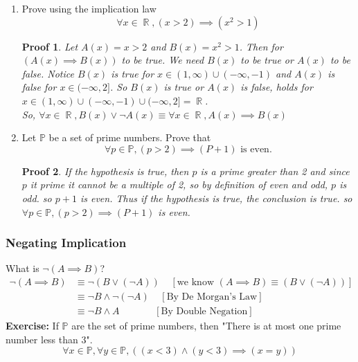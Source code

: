 \documentclass[10pt]{article}
\DeclareMathOperator{\R}{{\mathbb{R}}}
\theoremstyle{break}
\newtheorem*{pf}{Proof}
\begin{document}
\begin{enumerate}
    \item Prove using the implication law
    $$\forall x \in \R, (x > 2) \implies (x^2 > 1)$$
    \begin{pf}
        Let $A(x) = x > 2$ and $B(x) = x^2 > 1$. Then for $(A(x) \implies B(x))$ to be true. We need $B(x)$ to be true or $A(x)$ to be false. Notice 
        $B(x)$ is true for $x \in (1, \infty) \cup (-\infty, -1)$ and $A(x)$ is false for $x \in (-\infty, 2]$. So
        $B(x)$ is true or $A(x)$ is false, holds for $x \in (1, \infty) \cup (-\infty, -1) \cup (-\infty, 2] = \R$.\\
        So, $\forall x \in \R, B(x) \vee \neg A(x) \equiv \forall x \in \R, A(x) \implies B(x)$ 
    \end{pf}
    \item Let $\mathbb{P}$ be a set of prime numbers. Prove that $$\forall p \in \mathbb{P}, (p > 2) \implies (P + 1) \text{ is even.}$$
    \begin{pf}
        If the hypothesis is true, then $p$ is a prime greater than 2 and since $p$ it
        prime it cannot be a multiple of 2, so by definition of even and odd, $p$ is odd. so $p + 1$ is even.
        Thus if the hypothesis is true, the conclusion is true. so $\forall p \in \mathbb{P}, (p > 2) \implies (P + 1)$ is even.
    \end{pf}
\end{enumerate}
\subsubsection{Negating Implication}
What is $\neg (A \implies B)$?
\begin{align*}
    \neg (A \implies B) &\equiv \neg (B \vee (\neg A)) \; \; \; \; [\text{we know }(A \implies B) \equiv (B \vee (\neg A))]\\
    &\equiv \neg B \wedge  \neg (\neg A) \; \; \; \; [\text{By De Morgan's Law}]\\
    &\equiv \neg B \wedge A \; \; \; \; \; \; \; \; \; \; \; \; \;[\text{By Double Negation}]
\end{align*}
\textbf{Exercise: } If $\mathbb{P}$ are the set of prime numbers, then "There is at most one prime number less than 3".
$$\forall x \in \mathbb{P}, \forall y \in \mathbb{P}, ((x < 3) \wedge (y < 3) \implies (x = y))$$
\end{document}
